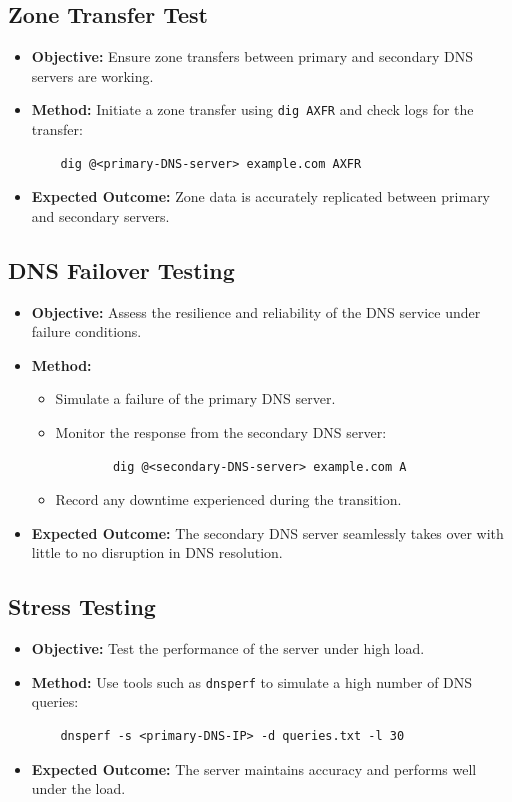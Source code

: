 \documentclass[a4paper,12pt]{article}
\begin{document}
\subsection*{Zone Transfer Test}
\begin{itemize}[leftmargin=1.5cm]
    \item \textbf{Objective:} Ensure zone transfers between primary and secondary DNS servers are working.
    \item \textbf{Method:} Initiate a zone transfer using \texttt{dig AXFR} and check logs for the transfer:
    \begin{verbatim}
    dig @<primary-DNS-server> example.com AXFR
    \end{verbatim}
    \item \textbf{Expected Outcome:} Zone data is accurately replicated between primary and secondary servers.
\end{itemize}

\subsection*{DNS Failover Testing}
\begin{itemize}[leftmargin=1.5cm]
    \item \textbf{Objective:} Assess the resilience and reliability of the DNS service under failure conditions.
    \item \textbf{Method:}
    \begin{itemize}
        \item Simulate a failure of the primary DNS server.
        \item Monitor the response from the secondary DNS server:
        \begin{verbatim}
        dig @<secondary-DNS-server> example.com A
        \end{verbatim}
        \item Record any downtime experienced during the transition.
    \end{itemize}
    \item \textbf{Expected Outcome:} The secondary DNS server seamlessly takes over with little to no disruption in DNS resolution.
\end{itemize}

\subsection*{Stress Testing}
\begin{itemize}[leftmargin=1.5cm]
    \item \textbf{Objective:} Test the performance of the server under high load.
    \item \textbf{Method:} Use tools such as \texttt{dnsperf} to simulate a high number of DNS queries:
    \begin{verbatim}
    dnsperf -s <primary-DNS-IP> -d queries.txt -l 30
    \end{verbatim}
    \item \textbf{Expected Outcome:} The server maintains accuracy and performs well under the load.
\end{itemize}
\end{document}
